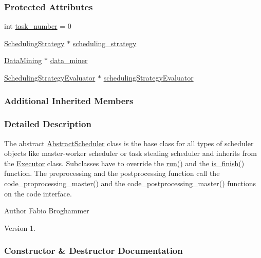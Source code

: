 \subsubsection*{Protected Attributes}
\begin{DoxyCompactItemize}
\item 
int \hyperlink{a00004_a284f6bdf5184c39cdb1e6b37f424ffab}{task\+\_\+number} = 0
\item 
\hyperlink{a00033}{Scheduling\+Strategy} $\ast$ \hyperlink{a00004_a7dd11eee79bfb44c820d6c28480fd0c7}{scheduling\+\_\+strategy}
\item 
\hyperlink{a00013}{Data\+Mining} $\ast$ \hyperlink{a00004_a6e281d90fa4b965779cd13eabf7d0249}{data\+\_\+miner}
\item 
\hyperlink{a00034}{Scheduling\+Strategy\+Evaluator} $\ast$ \hyperlink{a00004_a5f95e61e03441ca92c6ba8f434be7fe0}{scheduling\+Strategy\+Evaluator}
\end{DoxyCompactItemize}
\subsubsection*{Additional Inherited Members}


\subsubsection{Detailed Description}
The abstract \hyperlink{a00004}{Abstract\+Scheduler} class is the base class for all types of scheduler objects like master-\/worker scheduler or task stealing scheduler and inherits from the \hyperlink{a00015}{Executor} class. Subclasses have to override the \hyperlink{a00004_ab5f9142ccfc130e91fa6d92c7d3d7469}{run()} and the \hyperlink{a00004_acc7d6dc38aa80ca77ac892c74b915432}{is\+\_\+finish()} function. The preprocessing and the postprocessing function call the code\+\_\+proprocessing\+\_\+master() and the code\+\_\+postprocessing\+\_\+master() functions on the code interface.

\begin{DoxyAuthor}{Author}
Fabio Broghammer 
\end{DoxyAuthor}
\begin{DoxyVersion}{Version}
1. 
\end{DoxyVersion}


\subsubsection{Constructor \& Destructor Documentation}
\hypertarget{a00004_addaf6f185aefd7304df9a3cc4e020b00}{}
